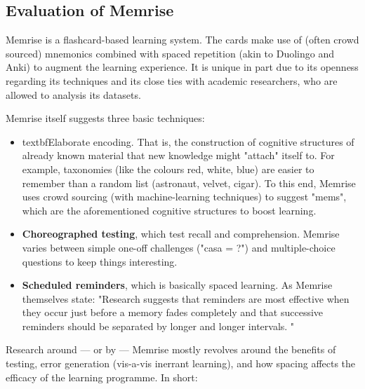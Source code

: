 \subsection{Evaluation of Memrise}

Memrise is a flashcard-based learning system. The cards make use of (often
crowd sourced) mnemonics combined with spaced repetition (akin to Duolingo and
Anki) to augment the learning experience. It is unique in part due to its
openness regarding its techniques and its close ties with academic researchers,
who are allowed to analysis its datasets.

Memrise itself suggests three basic techniques:\cite{memrise}

\begin{itemize}

\item textbf{Elaborate encoding.} That is, the construction of cognitive structures of
  already known material that new knowledge might "attach" itself to. For
  example, taxonomies (like the colours red, white, blue) are easier to remember
  than a random list (astronaut, velvet, cigar). To this end, Memrise uses
  crowd sourcing (with machine-learning techniques) to suggest "mems", which 
  are the aforementioned cognitive structures to boost learning.

\item \textbf{Choreographed testing}, which test recall and comprehension. Memrise varies
  between simple one-off challenges ("casa = ?") and multiple-choice questions
  to keep things interesting.

\item \textbf{Scheduled reminders}, which is basically spaced learning. As
  Memrise themselves state: "Research suggests that reminders are most effective
  when they occur just before a memory fades completely and that successive
  reminders should be separated by longer and longer intervals. "\cite{memrise}

\end{itemize}

Research around — or by — Memrise mostly revolves around the benefits of 
testing, error generation (vis-a-vis inerrant learning), and how spacing 
affects the efficacy of the learning programme. In short:

